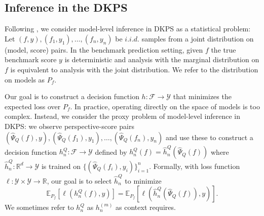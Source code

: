 \subsection{Inference in the DKPS}
Following \citet{helm-etal-2025-statistical}, we consider model-level inference in DKPS as a statistical problem: Let $ (f, y), (f_{1}, y_{1}), \hdots, (f_{n}, y_{n}) $ be $ i.i.d. $ samples from a joint distribution on (model,  score) pairs. 
In the benchmark prediction setting, given $ f $ the true benchmark score $ y $ is deterministic and analysis with the marginal distribution on $ f $ is equivalent to analysis with the joint distribution. 
We refer to the distribution on models as $ P_{f} $.

Our goal is to construct a decision function $ h: \mathcal{F} \to \mathcal{Y} $  that minimizes the expected loss over $ P_{f} $. 
In practice, operating directly on the space of models is too complex.
Instead, we consider the proxy problem of model-level inference in DKPS: we observe perspective-score pairs $ (\widehat{\Psi}_{Q}(f), y), (\widehat{\Psi}_{Q}(f_{1}), y_{1}), \ldots, (\widehat{\Psi}_{Q}(f_{n}), y_{n}) $ and use these to construct a decision function $ h_{n}^{Q}: \mathcal{F} \to \mathcal{Y} $ defined by $ h_{n}^{Q}(f) = \hat{h}_{n}^{Q}(\widehat{\Psi}_{Q}(f)) $ where $ \hat{h}_{n}^{Q}: \mathbb{R}^{d} \to \mathcal{Y} $ is trained on $ \{(\widehat{\Psi}_{Q}(f_{i}), y_{i})\}_{i=1}^{n} $.
Formally, with loss function $ \ell: \mathcal{Y} \times \mathcal{Y} \to \mathbb{R} $, our goal is to select $ \hat{h}_{n}^{Q} $ to minimize
\begin{equation*}
\mathbb{E}_{P_{f}}[\ell(h_{n}^{Q}(f), y)] = \mathbb{E}_{P_{f}}[\ell(\hat{h}_{n}^{Q}(\widehat{\Psi}_{Q}(f)), y)].
\end{equation*}
We sometimes refer to $ h_{n}^{Q} $ as $ h_{n}^{(m)} $ as context requires.


